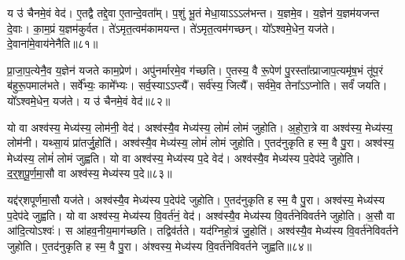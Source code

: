 य उ॑ चैनमे॒वं वेद॑।
ए॒तद्वै तद्दे॒वा ए॒तान्दे॒वता᳚म्।
प॒शुं भू॒तं मेधा॒याऽऽऽल॑भन्त।
य॒ज्ञमे॒व।
य॒ज्ञेन॑ य॒ज्ञम॑यजन्त दे॒वाः।
का॒म॒प्रं य॒ज्ञम॑कुर्वत।
ते॑ऽमृत॒त्वम॑कामयन्त।
ते॑ऽमृत॒त्वम॑गच्छन्।
यो᳚ऽश्वमे॒धेन॒ यज॑ते।
दे॒वाना॑मे॒वाय॑नेनैति॥८१॥\ip

प्रा॒जा॒प॒त्येनै॒व य॒ज्ञेन॑ यजते काम॒प्रेण॑।
अपु॑नर्मारमे॒व ग॑च्छति।
ए॒तस्य॒ वै रू॒पेण॑ पु॒रस्ता᳚त्प्राजाप॒त्यमृ॑ष॒भं तू॑प॒रं ब॑हुरू॒पमाल॑भते।
सर्वे᳚भ्यः॒ कामे᳚भ्यः।
सर्व॒स्याऽऽप्त्यै᳚।
सर्व॑स्य॒ जित्यै᳚।
सर्व॑मे॒व तेना᳚\-ऽऽ\-प्नोति।
सर्वं॑ जयति।
यो᳚ऽश्वमे॒धेन॒ यज॑ते।
य उ॑ चैनमे॒वं वेद॑॥८२॥\ip\anuvakamend[मेधो\-ऽभ॑व॒द्यज॑त एति॒ वेद॑]

यो वा अश्व॑स्य॒ मेध्य॑स्य॒ लोम॑नी॒ वेद॑।
अश्व॑स्यै॒व मेध्य॑स्य॒ लोमं॑ लोमं जुहोति।
अ॒हो॒रा॒त्रे वा अश्व॑स्य॒ मेध्य॑स्य॒ लोम॑नी।
यथ्सा॒यं प्रा॑तर्जु॒होति॑।
अश्व॑स्यै॒व मेध्य॑स्य॒ लोमं॑ लोमं जुहोति।
ए॒तद॑नुकृति ह स्म॒ वै पु॒रा।
अश्व॑स्य॒ मेध्य॑स्य॒ लोमं॑ लोमं जुह्वति।
यो वा अश्व॑स्य॒ मेध्य॑स्य प॒दे वेद॑।
अश्व॑स्यै॒व मेध्य॑स्य प॒देप॑दे जुहोति।
द॒र्॒श॒पू॒र्ण॒मा॒सौ वा अश्व॑स्य॒ मेध्य॑स्य प॒दे॥८३॥\ip

यद्द॑र्‌\mbox{}शपूर्णमा॒सौ यज॑ते।
अश्व॑स्यै॒व मेध्य॑स्य प॒देप॑दे जुहोति।
ए॒तद॑नुकृति ह स्म॒ वै पु॒रा।
अश्व॑स्य॒ मेध्य॑स्य प॒देप॑दे जुह्वति।
यो वा अश्व॑स्य॒ मेध्य॑स्य वि॒वर्त॑नं॒ वेद॑।
अश्व॑स्यै॒व मेध्य॑स्य वि॒वर्त॑नेविवर्तने जुहोति।
अ॒सौ वा आ॑दि॒त्यो\-ऽश्वः॑।
स आ॑हव॒नीय॒माग॑च्छति।
तद्विव॑र्तते।
यद॑ग्निहो॒त्रं जु॒होति॑।
अश्व॑स्यै॒व मेध्य॑स्य वि॒वर्त॑नेविवर्तने जुहोति।
ए॒तद॑नुकृति ह स्म॒ वै पु॒रा।
अ॑श्वस्य॒ मेध्य॑स्य वि॒वर्त॑नेविवर्तने जुह्वति॥८४॥\ip\anuvakamend[प॒दे अ॑ग्निहो॒त्रं जु॒होति॒ त्रीणि॑ च]

